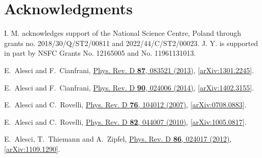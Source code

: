 \documentclass[graybox, secnum]{svmult}
\begin{document}
\section*{Acknowledgments}

I. M. acknowledges support of the National Science Centre, Poland through grants no. 2018/30/Q/ST2/00811 and 2022/44/C/ST2/00023. J. Y. is supported in part by NSFC Grants No. 12165005 and No. 11961131013.

\begin{thebibliography}{99}


E.~Alesci and F.~Cianfrani, %
  \href{http://dx.doi.org/10.1103/PhysRevD.87.083521}{Phys. Rev. D {\bfseries
  87}, 083521 (2013)},
  [\href{http://arxiv.org/abs/1301.2245}{arXiv:1301.2245}].

  E.~Alesci and F.~Cianfrani, %
  \href{https://doi.org/10.1103/PhysRevD.90.024006}{Phys. Rev. D {\bfseries
  90}, 024006 (2014)},
  [\href{http://arxiv.org/abs/1402.3155}{arXiv:1402.3155}].

E.~Alesci and C.~Rovelli, %
  \href{http://dx.doi.org/10.1103/PhysRevD.76.104012}{Phys. Rev. D {\bfseries
  76}, 104012 (2007)},
  [\href{http://arxiv.org/abs/0708.0883}{arXiv:0708.0883}].

E.~Alesci and C.~Rovelli, %
  \href{http://dx.doi.org/10.1103/PhysRevD.82.044007}{Phys. Rev. D {\bfseries
  82}, 044007 (2010)},
  [\href{http://arxiv.org/abs/1005.0817}{arXiv:1005.0817}].

E.~Alesci, T.~Thiemann and A.~Zipfel, %
  \href{http://dx.doi.org/10.1103/PhysRevD.86.024017}{Phys. Rev. D {\bfseries
  86}, 024017 (2012)},
  [\href{http://arxiv.org/abs/1109.1290}{arXiv:1109.1290}].


\end{thebibliography}
\end{document}
